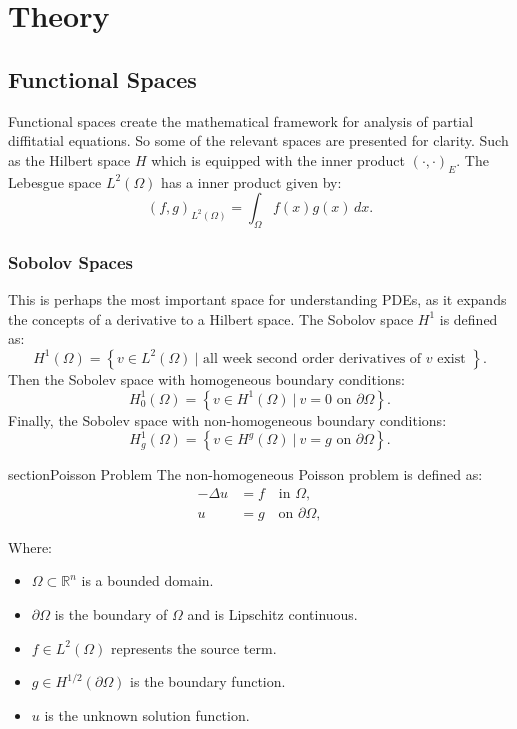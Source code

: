 \documentclass{report}
\begin{document}
\chapter{Theory}

\section{Functional Spaces}
Functional spaces create the mathematical framework for analysis of partial diffitatial equations. So some of the relevant spaces are presented for clarity. Such as the Hilbert space $H$ which is equipped with the inner product $(\cdot,\cdot)_E.$ The Lebesgue space $L^2(\Omega)$ has a inner product given by:
$$(f,g)_{L^2(\Omega)} = \int_{\Omega}f(x)g(x)\,dx.$$


\subsection{Sobolov Spaces}
This is perhaps the most important space for understanding PDEs, as it expands the concepts of a derivative to a Hilbert space. The Sobolov space $H^1$ is defined as:
$$ H^1(\Omega) = \left\{ v \in L^2(\Omega) \ \bigg| \text{ all week second order derivatives of $v$ exist }  \right\}. $$ \cite{brezis_functional_analysis}
Then the Sobolev space with homogeneous boundary conditions:
$$
H^1_0(\Omega) = \left\{ v \in H^1(\Omega) \ \bigg| \ v = 0 \text{ on } \partial\Omega \right\}.
$$
Finally, the Sobolev space with non-homogeneous boundary conditions:
$$
H^1_g(\Omega) = \left\{ v \in H^g(\Omega) \ \bigg| \ v = g \text{ on } \partial\Omega \right\}.
$$


section{Poisson Problem}
The non-homogeneous Poisson problem is defined as:
\begin{align}
    -\Delta u &= f \quad \text{in } \Omega, \label{eq:poisson}\\
    u &= g \quad \text{on } \partial \Omega, \label{eq:dirichlet}
\end{align}

Where:
\begin{itemize}
    \item $\Omega \subset \mathbb{R}^n$ is a bounded domain.
    \item $\partial\Omega$ is the boundary of $\Omega$ and is Lipschitz continuous.
    \item $f \in L^2(\Omega)$ represents the source term.
    \item $g \in H^{1/2}(\partial\Omega)$ is the boundary function.
    \item $u$ is the unknown solution function.
\end{itemize}
\end{document}
